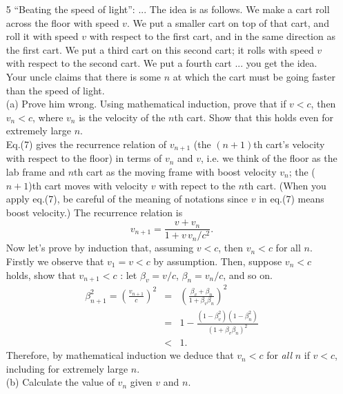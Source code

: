 \begin{enumerate}
\newpage

\item[5] ``Beating the speed of light'': ... The idea is as follows.  We
make a cart roll across the floor with speed $v$.  We put a smaller
cart on top of that cart, and roll it with speed $v$ with respect to
the first cart, and in the same direction as the first cart. We put a
third cart on this second cart; it rolls with speed $v$ with respect
to the second cart. We put a fourth cart ... you get the idea.  Your
uncle claims that there is some $n$ at which the cart must be going
faster than the speed of light.\\ (a) Prove him wrong. Using
mathematical induction, prove that if $v < c$, then $v_n < c$, where
$v_n$ is the velocity of the $n$th cart. Show that this holds even for
extremely large $n$.\\

Eq.(7) gives the recurrence relation of $v_{n+1}$ (the $(n+1)$th
cart's velocity with respect to the floor) in terms of $v_n$ and $v$,
i.e. we think of the floor as the lab frame and $n$th cart as the
moving frame with boost velocity $v_n$; the ($n+1$)th cart moves with
velocity $v$ with repect to the $n$th cart.  (When you apply eq.(7),
be careful of the meaning of notations since $v$ in eq.(7) means boost
velocity.) The recurrence relation is
\begin{equation}
v_{n+1}=\frac{v+v_n}{1+v\,v_n/c^2}.
\end{equation}
Now let's prove by induction that, assuming $v<c$, then $v_n<c$ for all $n$.  
Firstly we observe that $v_1=v<c$ by assumption.
Then, suppose $v_n<c$ holds, show that $v_{n+1}<c$ :  let $\beta_v=v/c$,
$\beta_n=v_n/c$, and so on.
\begin{eqnarray}
\beta_{n+1}^2 = (\frac{v_{n+1}}{c})^2 &=& \left(\frac{\beta_v+\beta_n}{1+\beta_v
\beta_n}\right)^2\nonumber\\
&=& 1-\frac{(1-\beta_v^2)(1-\beta_n^2)}{(1+\beta_v
\beta_n)^2}\nonumber\\
&<& 1.
\end{eqnarray}
Therefore, by mathematical induction we deduce that $v_n<c$ for {\sl all}
$n$ if $v<c$, including for extremely large $n$.\\

(b) Calculate the value of $v_n$ given $v$ and $n$. \\


\end{enumerate}
